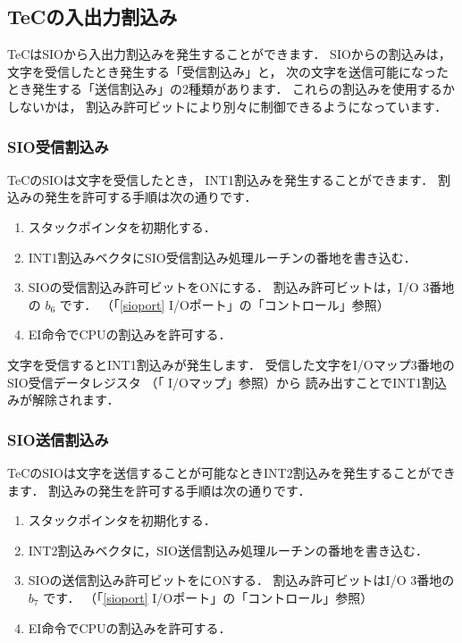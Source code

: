 \subsection{TeCの入出力割込み}
TeCはSIOから入出力割込みを発生することができます．
SIOからの割込みは，
文字を受信したとき発生する「受信割込み」と，
次の文字を送信可能になったとき発生する「送信割込み」の2種類があります．
これらの割込みを使用するかしないかは，
割込み許可ビットにより別々に制御できるようになっています．

\subsubsection{SIO受信割込み}
TeCのSIOは文字を受信したとき，
INT1割込みを発生することができます．
割込みの発生を許可する手順は次の通りです．

\begin{enumerate}
\item スタックポインタを初期化する．
\item INT1割込みベクタにSIO受信割込み処理ルーチンの番地を書き込む．
\item SIOの受信割込み許可ビットをONにする．
割込み許可ビットは，I/O 3番地の $b_6$ です．
（「\ref{sioport} I/Oポート」の「コントロール」参照）
\item EI命令でCPUの割込みを許可する．

\end{enumerate}

文字を受信するとINT1割込みが発生します．
受信した文字をI/Oマップ3番地のSIO受信データレジスタ
（「 I/Oマップ」参照）から
読み出すことでINT1割込みが解除されます．


\subsubsection{SIO送信割込み}

TeCのSIOは文字を送信することが可能なときINT2割込みを発生することができます．
割込みの発生を許可する手順は次の通りです．

\begin{enumerate}
\item スタックポインタを初期化する．
\item INT2割込みベクタに，SIO送信割込み処理ルーチンの番地を書き込む．
\item SIOの送信割込み許可ビットをにONする．
割込み許可ビットはI/O 3番地の $b_7$ です．
（「\ref{sioport} I/Oポート」の「コントロール」参照）
\item EI命令でCPUの割込みを許可する．
\end{enumerate}

